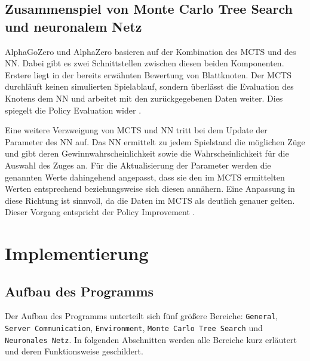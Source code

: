 \documentclass[12pt,a4paper]{article}
\begin{document}
\subsection{Zusammenspiel von Monte Carlo Tree Search und neuronalem Netz}
AlphaGoZero und AlphaZero basieren auf der Kombination des MCTS und des NN. Dabei gibt es zwei Schnittstellen zwischen diesen beiden Komponenten. 
Erstere liegt in der bereits erwähnten Bewertung von Blattknoten. Der MCTS durchläuft keinen simulierten Spielablauf, sondern überlässt die Evaluation des Knotens dem NN und arbeitet mit den zurückgegebenen Daten weiter. Dies spiegelt die Policy Evaluation wider \cite{Silver2017}.

Eine weitere Verzweigung von MCTS und NN tritt bei dem Update der Parameter des NN auf. Das NN ermittelt zu jedem Spielstand die möglichen Züge und gibt deren Gewinnwahrscheinlichkeit sowie die Wahrscheinlichkeit für die Auswahl des Zuges an. Für die Aktualisierung der Parameter werden die genannten Werte dahingehend angepasst, dass sie den im MCTS ermittelten Werten entsprechend beziehungsweise sich diesen annähern. Eine Anpassung in diese Richtung ist sinnvoll, da die Daten im MCTS als deutlich genauer gelten. Dieser Vorgang entspricht der Policy Improvement \cite{Silver2017}.

\newpage
\section{Implementierung}

\subsection{Aufbau des Programms}
Der Aufbau des Programms unterteilt sich fünf größere Bereiche: \texttt{General}, \texttt{Server Communication}, \texttt{Environment}, \texttt{Monte Carlo Tree Search} und \texttt{Neuronales Netz}. In folgenden Abschnitten werden alle Bereiche kurz erläutert und deren Funktionsweise geschildert.
\end{document}
